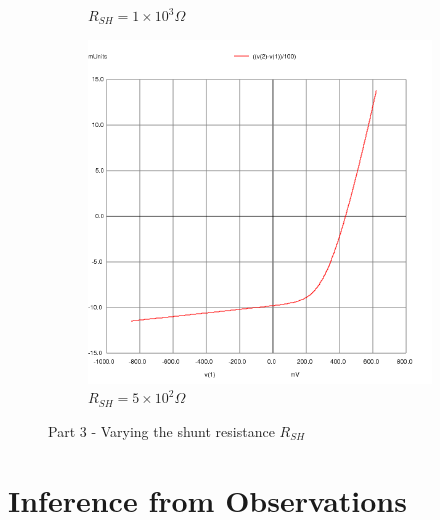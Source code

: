 \documentclass[12pt]{article}
\begin{document}
\begin{figure}[H]
\begin{subfigure}[b]{0.45\linewidth}
		\caption{\( R_{SH} = 1 \times 10^3 \Omega\)}
	\end{subfigure} 
	\begin{subfigure}[b]{0.45\linewidth}
		\includegraphics[width = \linewidth, trim = {0 0 0 0}, clip]{part3_rsh5e2.png}
		\caption{\( R_{SH} = 5 \times 10^2 \Omega\)}
	\end{subfigure} 
		\caption{Part 3 - Varying the shunt resistance \( R_{SH} \)}
\end{figure}

\section{Inference from Observations}
\end{document}
